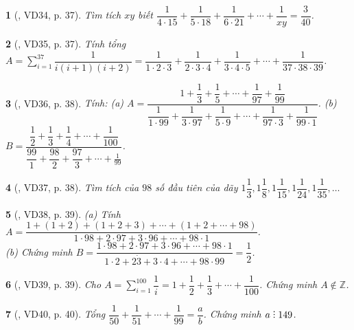 \documentclass{article}
\newtheorem{baitoan}{}
\DeclareRobustCommand{\divby}{%
	\mathrel{\vbox{\baselineskip.65ex\lineskiplimit0pt\hbox{.}\hbox{.}\hbox{.}}}%
}
\begin{document}
\begin{baitoan}[\cite{Binh_Toan_6_tap_2}, VD34, p. 37]
	Tìm tích $xy$ biết $\dfrac{1}{4\cdot15} + \dfrac{1}{5\cdot18} + \dfrac{1}{6\cdot21} + \cdots + \dfrac{1}{xy} = \dfrac{3}{40}$.
\end{baitoan}

\begin{baitoan}[\cite{Binh_Toan_6_tap_2}, VD35, p. 37]
	Tính tổng $A = \sum_{i=1}^{37} \dfrac{1}{i(i + 1)(i + 2)} = \dfrac{1}{1\cdot2\cdot3} + \dfrac{1}{2\cdot3\cdot4} + \dfrac{1}{3\cdot4\cdot5} + \cdots + \dfrac{1}{37\cdot38\cdot39}$.
\end{baitoan}

\begin{baitoan}[\cite{Binh_Toan_6_tap_2}, VD36, p. 38]
	Tính: (a) $A = \dfrac{1 + \dfrac{1}{3} + \dfrac{1}{5} + \cdots + \dfrac{1}{97} + \dfrac{1}{99}}{\dfrac{1}{1\cdot99} + \dfrac{1}{3\cdot97} + \dfrac{1}{5\cdot9} + \cdots + \dfrac{1}{97\cdot3} + \dfrac{1}{99\cdot1}}$. (b) $B = \dfrac{\dfrac{1}{2} + \dfrac{1}{3} + \dfrac{1}{4} + \cdots + \dfrac{1}{100}}{\dfrac{99}{1} + \dfrac{98}{2} + \dfrac{97}{3} + \cdots + \frac{1}{99}}$.
\end{baitoan}

\begin{baitoan}[\cite{Binh_Toan_6_tap_2}, VD37, p. 38]
	Tìm tích của $98$ số đầu tiên của dãy $1\dfrac{1}{3},1\dfrac{1}{8},1\dfrac{1}{15},1\dfrac{1}{24},1\dfrac{1}{35},\ldots$
\end{baitoan}

\begin{baitoan}[\cite{Binh_Toan_6_tap_2}, VD38, p. 39]
	(a) Tính $A = \dfrac{1 + (1 + 2) + (1 + 2 + 3) + \cdots + (1 + 2 + \cdots + 98)}{1\cdot98 + 2\cdot97 + 3\cdot96 + \cdots + 98\cdot1}$.\\(b) Chứng minh $B = \dfrac{1\cdot98 + 2\cdot97 + 3\cdot96 + \cdots + 98\cdot1}{1\cdot2 + 2\dot3 + 3\cdot4 + \cdots + 98\cdot99} = \dfrac{1}{2}$.
\end{baitoan}

\begin{baitoan}[\cite{Binh_Toan_6_tap_2}, VD39, p. 39]
	Cho $A = \sum_{i=1}^{100} \dfrac{1}{i} = 1 + \dfrac{1}{2} + \dfrac{1}{3} + \cdots + \dfrac{1}{100}$. Chứng minh $A\notin\mathbb{Z}$.
\end{baitoan}

\begin{baitoan}[\cite{Binh_Toan_6_tap_2}, VD40, p. 40]
	Tổng $\dfrac{1}{50} + \dfrac{1}{51} + \cdots + \dfrac{1}{99} = \dfrac{a}{b}$. Chứng minh $a\divby149$.
\end{baitoan}
\end{document}
